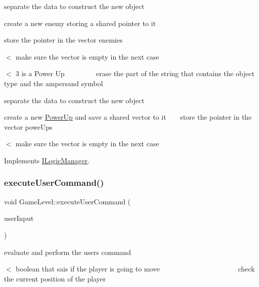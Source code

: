 separate the data to construct the new object

create a new enemy storing a shared pointer to it

store the pointer in the vector enemies

$<$ make sure the vector is empty in the next case

$<$ 3 is a Power Up ~\newline
~\newline
~\newline
~\newline
~\newline
 erase the part of the string that contains the object type and the ampersand symbol

separate the data to construct the new object

create a new \mbox{\hyperlink{class_power_up}{Power\+Up}} and save a shared vector to it ~\newline
~\newline
 store the pointer in the vector powe\+Ups

$<$ make sure the vector is empty in the next case 

Implements \mbox{\hyperlink{class_i_logic_manager}{I\+Logic\+Manager}}.

\mbox{\label{class_game_level_a53cd899aa9aeaf3e9579ff32598b0043}} 
\subsubsection{\texorpdfstring{execute\+User\+Command()}{executeUserCommand()}}
{\footnotesize\ttfamily void Game\+Level\+::execute\+User\+Command (\begin{DoxyParamCaption}\item[{User\+Input\+Type}]{user\+Input }\end{DoxyParamCaption})\hspace{0.3cm}{\ttfamily [virtual]}}



evaluate and perform the user\textquotesingle{}s command 

$<$ boolean that sais if the player is going to move ~\newline
~\newline
~\newline
~\newline
~\newline
~\newline
~\newline
~\newline
~\newline
~\newline
~\newline
~\newline
~\newline
 check the current position of the player

